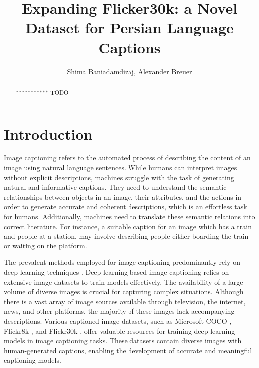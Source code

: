 \documentclass[runningheads]{llncs}
\begin{document}
%
\title{Expanding Flicker30k: a Novel Dataset for Persian Language Captions}
%
%
\author{Shima Baniadamdizaj,
Alexander Breuer}
%
%
%
\maketitle              %
%
\begin{abstract}
*********** TODO

\end{abstract}
%
%
%
\section{Introduction}
Image captioning refers to the automated process of describing the content of an image using natural language sentences. While humans can interpret images without explicit descriptions, machines struggle with the task of generating natural and informative captions. They need to understand the semantic relationships between objects in an image, their attributes, and the actions in order to generate accurate and coherent descriptions, which is an effortless task for humans. Additionally, machines need to translate these semantic relations into correct literature. For instance, a suitable caption for an image which has a train and people at a station, may involve describing people either boarding the train or waiting on the platform.

The prevalent methods employed for image captioning predominantly rely on deep learning techniques \cite{Karpathy2015,Vinyals2015,Xu2015,Luo2023}. Deep learning-based image captioning relies on extensive image datasets to train models effectively. The availability of a large volume of diverse images is crucial for capturing complex situations. Although there is a vast array of image sources available through television, the internet, news, and other platforms, the majority of these images lack accompanying descriptions. Various captioned image datasets, such as Microsoft COCO \cite{MSCOCO}, Flickr8k \cite{Flickr8k}, and Flickr30k \cite{Flickr30k}, offer valuable resources for training deep learning models in image captioning tasks. These datasets contain diverse images with human-generated captions, enabling the development of accurate and meaningful captioning models.
\end{document}
